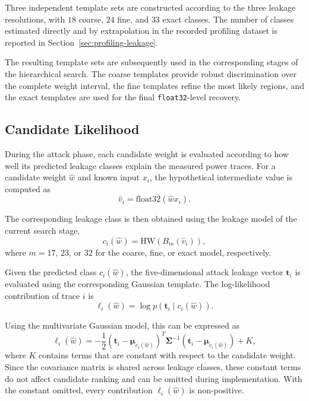\documentclass[conference]{IEEEtran}
\begin{document}
Three independent template sets are constructed according to the three leakage resolutions, with $18$ coarse, $24$ fine, and $33$ exact classes.
The number of classes estimated directly and by extrapolation in the recorded profiling dataset is reported in Section~\ref{sec:profiling-leakage}.

The resulting template sets are subsequently used in the corresponding stages of the hierarchical search.
The coarse templates provide robust discrimination over the complete weight interval, the fine templates refine the most likely regions, and the exact templates are used for the final \texttt{float32}-level recovery.

\subsection{Candidate Likelihood}
\label{sec:candidate-likelihood}

During the attack phase, each candidate weight is evaluated according to how well its predicted leakage classes explain the measured power traces.
For a candidate weight $\hat{w}$ and known input $x_i$, the hypothetical intermediate value is computed as
\begin{equation*}
	\hat{v}_i =
	\mathrm{float32}(\hat{w}x_i).
\end{equation*}

The corresponding leakage class is then obtained using the leakage model of the current search stage,
\begin{equation*}
	c_i(\hat{w})
	=
	\mathrm{HW}
	\left(
	B_m(\hat{v}_i)
	\right),
\end{equation*}
where $m=17$, $23$, or $32$ for the coarse, fine, or exact model, respectively.

Given the predicted class $c_i(\hat{w})$, the five-dimensional attack leakage vector $\mathbf{t}_i$ is evaluated using the corresponding Gaussian template.
The log-likelihood contribution of trace $i$ is
\begin{equation*}
	\ell_i(\hat{w})
	=
	\log
	p
	\left(
	\mathbf{t}_i
	\mid
	c_i(\hat{w})
	\right).
\end{equation*}

Using the multivariate Gaussian model, this can be expressed as
\begin{equation*}
	\ell_i(\hat{w})
	=
	-\frac{1}{2}
	\left(
	\mathbf{t}_i-\boldsymbol{\mu}_{c_i(\hat{w})}
	\right)^T
	\boldsymbol{\Sigma}^{-1}
	\left(
	\mathbf{t}_i-\boldsymbol{\mu}_{c_i(\hat{w})}
	\right)
	+ K,
\end{equation*}
where $K$ contains terms that are constant with respect to the candidate weight.
Since the covariance matrix is shared across leakage classes, these constant terms do not affect candidate ranking and can be omitted during implementation.
With the constant omitted, every contribution $\ell_i(\hat{w})$ is non-positive.
\end{document}
